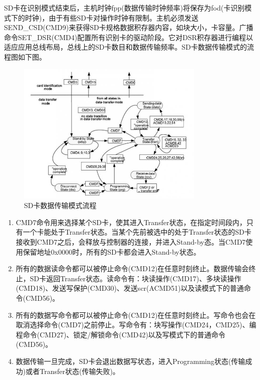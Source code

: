 SD卡在识别模式结束后，主机时钟fpp(数据传输时钟频率)将保存为fod(卡识别模式下的时钟)，由于有些SD卡对操作时钟有限制。主机必须发送SEND\_CSD(CMD9)来获得SD卡规格数据积存器内容，如块大小，卡容量。广播命令SET\_DSR(CMD4)配置所有识别卡的驱动阶段。它对DSR积存器进行编程以适应应用总线布局，总线上的SD卡数目和数据传输频率。SD卡数据传输模式的流程图如下图。
\begin{figure}[H]
    \centering
    \includegraphics[width=0.8\textwidth]{figures/06-02-数据传输.png}
    \caption{SD卡数据传输模式流程}
\end{figure}

\begin{enumerate}
	\item CMD7命令用来选择某个SD卡，使其进入Transfer状态，在指定时间段内，只有一个卡能处于Transfer状态。当某个先前被选中的处于Transfer状态的SD卡接收到CMD7之后，会释放与控制器的连接，并进入Stand-by态。当CMD7使用保留地址0x0000时，所有的SD卡都会进入Stand-by状态。
	\item 所有的数据读命令都可以被停止命令(CMD12)在任意时刻终止。数据传输会终止，SD卡返回Transfer状态。读命令有：块读操作(CMD17)、多块读操作(CMD18)、发送写保护(CMD30)、发送scr(ACMD51)以及读模式下的普通命令(CMD56)。
	\item 所有的数据写命令都可以被停止命令(CMD12)在任意时刻终止。写命令也会在取消选择命令(CMD7)之前停止。写命令有：块写操作(CMD24，CMD25)、编程命令(CMD27)、锁定/解锁命令(CMD42)以及写模式下的普通命令(CMD56)。
	\item 数据传输一旦完成，SD卡会退出数据写状态，进入Programming状态(传输成功)或者Transfer状态(传输失败)。
\end{enumerate}
\clearpage